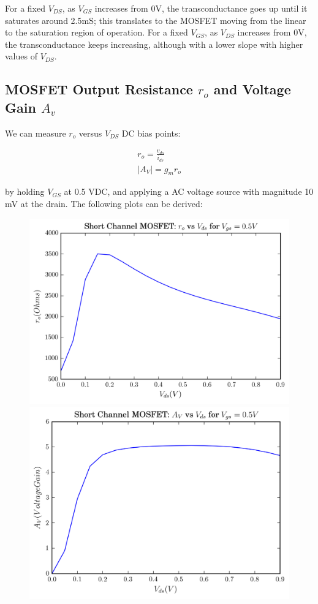 \documentclass[11pt]{article}
\begin{document}
For a fixed $V_{DS}$, as $V_{GS}$ increases from 0V, the transconductance goes up until it saturates around 2.5mS; this translates to the MOSFET moving from the linear to the saturation region of operation. For a fixed $V_{GS}$, as $V_{DS}$ increases from 0V, the transconductance keeps increasing, although with a lower slope with higher values of $V_{DS}$. 

\subsection{MOSFET Output Resistance $r_o$ and Voltage Gain $A_v$}
We can measure $r_o$ versus $V_{DS}$ DC bias points:

\begin{eqnarray}
	r_o = \frac{v_{ds}}{i_{ds}} \nonumber \\
	|A_V| = g_m r_o \nonumber
\end{eqnarray}

by holding $V_{GS}$ at 0.5 VDC, and applying a AC voltage source with magnitude 10 mV at the drain. The following plots can be derived:

\begin{figure}[H]
	\includegraphics[width=\linewidth]{images/short_channel_ro_vs_vds.png}
	\endminipage\hfill
	\includegraphics[width=\linewidth]{images/short_channel_av_vs_vds.png}
	\endminipage
\end{figure}
\end{document}

